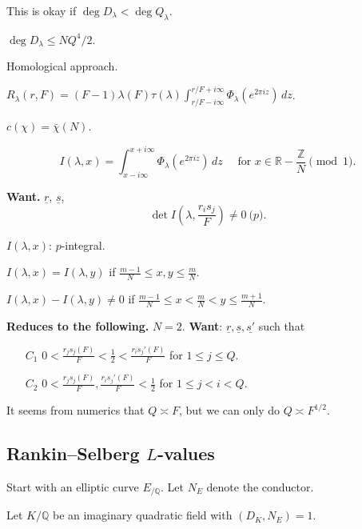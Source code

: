 \documentclass[reqno]{amsart} 
\begin{document}
This is okay if $\deg D_\lambda < \deg Q_\lambda$.

$\deg D_\lambda \leq N Q^4/2$.

Homological approach.

$R_\lambda(r, F) =(F - 1) \lambda(F) \tau(\lambda) \int_{r/F - i \infty}^{r/F + i \infty} \Phi_\lambda \left( e^{2 \pi i z} \right) \, d z$.

$c(\chi) = \bar{\chi}(N)$.

\begin{equation*}
  I(\lambda, x) = \int_{x - i \infty}^{x + i \infty}
  \Phi_\lambda(e^{2 \pi i z}) \, d z
  \quad \text{ for } x \in \mathbb{R} - \frac{\mathbb{Z}}{N} \pmod{1}.
\end{equation*}

\textbf{Want.} $\underline{r}$, $\underline{s}$,
\begin{equation*}
\det I \left( \lambda, \frac{r_i s_j}{F} \right) \neq 0 \pod{p}.
\end{equation*}

$I(\lambda, x)$: $p$-integral.

$I(\lambda, x) = I(\lambda, y)$ if $\frac{m - 1}{N} \leq x, y \leq \frac{m}{N}$.

$I(\lambda, x) - I(\lambda, y) \neq 0$ if $\frac{m - 1}{N} \leq x < \frac{m}{N} < y \leq \frac{m + 1}{N}$.

\textbf{Reduces to the following.}
$N = 2$.  \textbf{Want}: $\underline{r}, \underline{s}, \underline{s'}$ such that
\begin{enumerate}
\item[$C_1$] $0 < \frac{r_j s_j(F) }{F} < \frac{1}{2} < \frac{r_i s_j '(F) }{F}$ for $1 \leq j \leq Q$.
\item[$C_2$] $0 < \frac{r_j s_j(F) }{F}, \frac{r_i s_j '(F) }{F} < \frac{1}{2}$ for $1 \leq j < i < Q$.
\end{enumerate}

\begin{remark}\label{remark:cnfg5j6hsm}
  It seems from numerics that $Q \asymp F$, but we can only do $Q \asymp F^{1/2}$.
\end{remark}

\subsection{Rankin--Selberg $L$-values}
Start with an elliptic curve $E_{/\mathbb{Q}}$.  Let $N_E$ denote the conductor.

Let $K/\mathbb{Q}$ be an imaginary quadratic field with $(D_K, N_E) = 1$.
\end{document}
